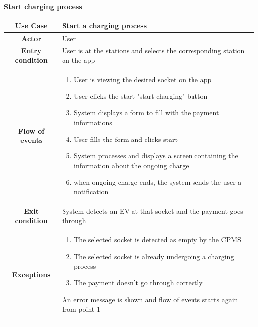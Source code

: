 \documentclass[table, 12pt]{article} %
\begin{document}
\begin{itemize}
             \begin{table}[H]
                \item[] \textbf{Start charging process}
                \item[]
                \centering
                \begin{tabular}{|c |m{}|}
                    \hline
                    \textbf{Use Case} & Start a charging process\\ \hline
                    \textbf{Actor} & User\\ \hline
                    \textbf{Entry condition} & User is at the stations and selects the corresponding station on the app \\  \hline
                    \textbf{Flow of events} & \begin{enumerate}
                                                \item User is viewing the desired socket on the app
                                                \item User clicks the start "start charging" button
                                                \item System displays a form to fill with the payment informations
                                                \item User fills the form and clicks start
                                                \item System processes and displays a screen containing the information about the ongoing charge
                                                \item when ongoing charge ends, the system sends the user a notification
                                            \end{enumerate}\\ \hline
                    \textbf{Exit condition} &  System detects an EV at that socket and the payment goes through\\ \hline
                    \textbf{Exceptions} &  \begin{enumerate}
                        \item The selected socket is detected as empty by the CPMS
                        \item The selected socket is already undergoing a charging process
                        \item The payment doesn't go through correctly
                    \end{enumerate}
                    An error message is shown and flow of events starts again from point 1\\ \hline
                \end{tabular}
            \end{table}


\end{itemize}
\end{document}
